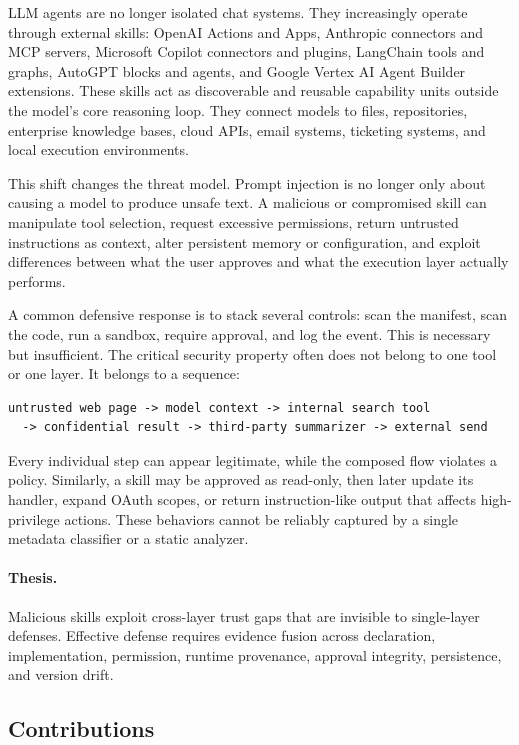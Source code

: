 \documentclass[10pt]{article}
\begin{document}
LLM agents are no longer isolated chat systems. They increasingly operate through external skills: OpenAI Actions and Apps, Anthropic connectors and MCP servers, Microsoft Copilot connectors and plugins, LangChain tools and graphs, AutoGPT blocks and agents, and Google Vertex AI Agent Builder extensions. These skills act as discoverable and reusable capability units outside the model's core reasoning loop. They connect models to files, repositories, enterprise knowledge bases, cloud APIs, email systems, ticketing systems, and local execution environments.

This shift changes the threat model. Prompt injection is no longer only about causing a model to produce unsafe text. A malicious or compromised skill can manipulate tool selection, request excessive permissions, return untrusted instructions as context, alter persistent memory or configuration, and exploit differences between what the user approves and what the execution layer actually performs.

A common defensive response is to stack several controls: scan the manifest, scan the code, run a sandbox, require approval, and log the event. This is necessary but insufficient. The critical security property often does not belong to one tool or one layer. It belongs to a sequence:

\begin{lstlisting}
untrusted web page -> model context -> internal search tool
  -> confidential result -> third-party summarizer -> external send
\end{lstlisting}

Every individual step can appear legitimate, while the composed flow violates a policy. Similarly, a skill may be approved as read-only, then later update its handler, expand OAuth scopes, or return instruction-like output that affects high-privilege actions. These behaviors cannot be reliably captured by a single metadata classifier or a static analyzer.

\paragraph{Thesis.} Malicious skills exploit cross-layer trust gaps that are invisible to single-layer defenses. Effective defense requires evidence fusion across declaration, implementation, permission, runtime provenance, approval integrity, persistence, and version drift.

\subsection{Contributions}
\end{document}
